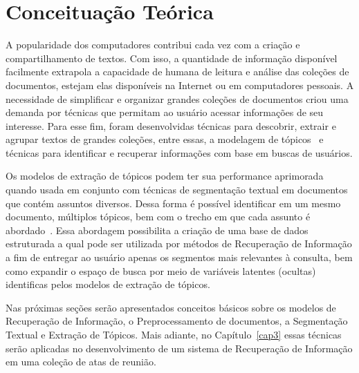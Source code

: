 \chapter{Conceituação Teórica}\label{cap2}


A popularidade dos computadores contribui cada vez com a criação e compartilhamento de textos. Com isso, a quantidade de informação disponível facilmente extrapola a capacidade de humana de leitura e análise das coleções de documentos, estejam elas disponíveis na Internet ou em computadores pessoais. A necessidade de simplificar e organizar grandes coleções de documentos criou uma demanda por técnicas que permitam ao usuário acessar informações de seu interesse. Para esse fim, foram desenvolvidas técnicas para descobrir, extrair e agrupar textos de grandes coleções, entre essas, a modelagem de tópicos~\cite{Hofmann1999,Deerwester1990,Lee1999,Blei2012} e técnicas para identificar e recuperar informações com base em buscas de usuários.  



Os modelos de extração de tópicos podem ter sua performance aprimorada quando usada em conjunto com técnicas de segmentação textual em documentos que contém assuntos diversos. Dessa forma é possível identificar em um mesmo documento, múltiplos tópicos, bem com o trecho em que cada assunto é abordado~\cite{Tagarelli2013, Cuong2011}. Essa abordagem possibilita a criação de uma base de dados estruturada a qual pode ser utilizada por métodos de Recuperação de Informação a fim de entregar ao usuário apenas os segmentos mais relevantes à consulta, bem como expandir o espaço de busca por meio de variáveis latentes (ocultas) identificas pelos modelos de extração de tópicos.




Nas próximas seções serão apresentados conceitos básicos sobre os modelos de Recuperação de Informação, o Preprocessamento de documentos, a Segmentação Textual e Extração de Tópicos. Mais adiante, no Capítulo~\ref{cap3} essas técnicas serão aplicadas no desenvolvimento de um sistema de Recuperação de Informação em uma coleção de atas de reunião.




